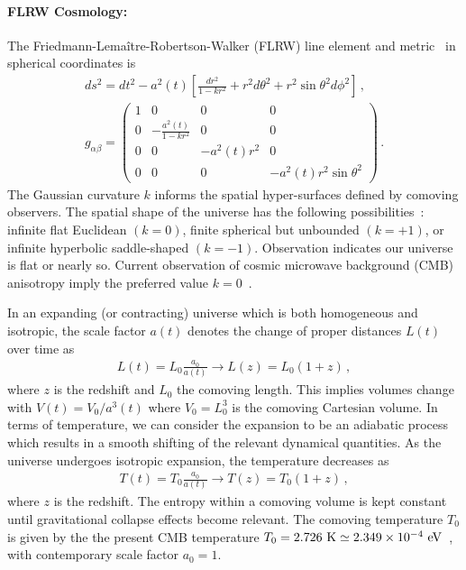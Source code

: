 {\paragraph{FLRW Cosmology:} The Friedmann-Lema{\^i}tre-Robertson-Walker (FLRW) line element and metric~\cite{Hobson:2006se,Hartle:2003yu,Misner:1973prb,Weinberg:1972kfs} in spherical coordinates is
\begin{gather}
 \label{FLRW} ds^2=dt^2-a^2(t)\left[\frac{dr^2}{1-kr^{2}}+r^{2}d\theta^2+r^{2}\sin\theta^{2}d\phi^2\right]\,,\\[0.3cm]
 g_{\alpha\beta}=
 \begin{pmatrix}
 1&0&0&0\\
 0&-\displaystyle\frac{a^{2}(t)}{1-kr^{2}}&0&0\\
 0&0&-a^{2}(t)r^{2}&0\\
 0&0&0&-a^{2}(t)r^{2}\sin\theta^{2}
 \end{pmatrix}\,.
\end{gather}
The Gaussian curvature $k$ informs the spatial hyper-surfaces defined by comoving observers. The spatial shape of the universe has the following possibilities~\cite{Planck:2018vyg}: infinite flat Euclidean $(k=0)$, finite spherical but unbounded $(k=+1)$, or infinite hyperbolic saddle-shaped $(k=-1)$. Observation indicates our universe is flat or nearly so. Current observation of cosmic microwave background (CMB) anisotropy imply the preferred value $k=0$~\cite{Planck:2018vyg,Planck:2015fie,Planck:2013pxb}.

In an expanding (or contracting) universe which is both homogeneous and isotropic, the scale factor $a(t)$ denotes the change of proper distances $L(t)$ over time as
\begin{gather}
 L(t)=L_{0}\frac{a_{0}}{a(t)}\rightarrow L(z)=L_{0}(1+z)\,,
\end{gather}
where $z$ is the redshift and $L_{0}$ the comoving length. This implies volumes change with $V(t)=V_{0}/a^{3}(t)$ where $V_{0}=L_{0}^{3}$ is the comoving Cartesian volume. In terms of temperature, we can consider the expansion to be an adiabatic process~\cite{Abdalla:2022yfr} which results in a smooth shifting of the relevant dynamical quantities. As the universe undergoes isotropic expansion, the temperature decreases as 
\begin{gather}
 \label{tscale}
 T(t)=T_{0}\frac{a_{0}}{a(t)}\rightarrow T(z)=T_{0}(1+z)\,,
\end{gather}
where $z$ is the redshift. The entropy within a comoving volume is kept constant until gravitational collapse effects become relevant. The comoving temperature $T_{0}$ is given by the the present CMB temperature $T_{0}=2.726{\rm\ K}\simeq 2.349\times10^{-4}\text{ eV}$~\cite{Planck:2018vyg}, with contemporary scale factor $a_{0}=1$.

}
